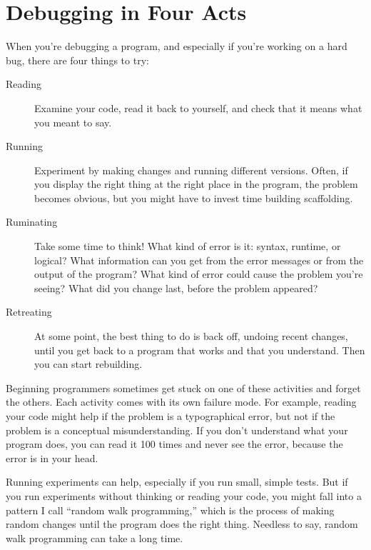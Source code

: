 \section{Debugging in Four Acts}


When you're debugging a program, and especially if you're working on a hard bug, there are four things to try:

\begin{description}

\item[Reading] Examine your code, read it back to yourself, and
check that it means what you meant to say.

\item[Running] Experiment by making changes and running different
versions.  Often, if you display the right thing at the right place
in the program, the problem becomes obvious, but you might have to invest time building scaffolding.

\item[Ruminating] Take some time to think!  What kind of error
is it: syntax, runtime, or logical?  What information can you get from
the error messages or from the output of the program?  What kind of
error could cause the problem you're seeing?  What did you change
last, before the problem appeared?

\item[Retreating] At some point, the best thing to do is back
off, undoing recent changes, until you get back to a program that
works and that you understand.  Then you can start rebuilding.

\end{description}

Beginning programmers sometimes get stuck on one of these activities
and forget the others.  Each activity comes with its own failure
mode.
For example, reading your code might help if the problem is a
typographical error, but not if the problem is a conceptual
misunderstanding.  If you don't understand what your program does, you
can read it 100 times and never see the error, because the error is in
your head.

Running experiments can help, especially if you run small, simple
tests.  But if you run experiments without thinking or reading your
code, you might fall into a pattern I call ``random walk programming,''
which is the process of making random changes until the program
does the right thing.  Needless to say, random walk programming
can take a long time.

